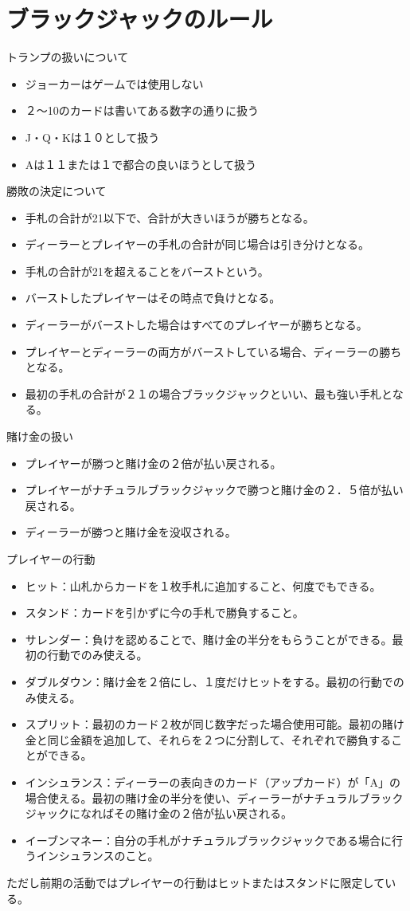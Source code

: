 \section{ブラックジャックのルール}

トランプの扱いについて
\begin{itemize}
\item ジョーカーはゲームでは使用しない
\item ２～10のカードは書いてある数字の通りに扱う
\item J・Q・Kは１０として扱う
\item Aは１１または１で都合の良いほうとして扱う
\end{itemize}
勝敗の決定について
\begin{itemize}
\item 手札の合計が21以下で、合計が大きいほうが勝ちとなる。
\item ディーラーとプレイヤーの手札の合計が同じ場合は引き分けとなる。
\item 手札の合計が21を超えることをバーストという。
\item バーストしたプレイヤーはその時点で負けとなる。
\item ディーラーがバーストした場合はすべてのプレイヤーが勝ちとなる。
\item プレイヤーとディーラーの両方がバーストしている場合、ディーラーの勝ちとなる。
\item 最初の手札の合計が２１の場合ブラックジャックといい、最も強い手札となる。
\end{itemize}
賭け金の扱い
\begin{itemize}
\item プレイヤーが勝つと賭け金の２倍が払い戻される。
\item プレイヤーがナチュラルブラックジャックで勝つと賭け金の２．５倍が払い戻される。
\item ディーラーが勝つと賭け金を没収される。
\end{itemize}
プレイヤーの行動
\begin{itemize}
\item ヒット：山札からカードを１枚手札に追加すること、何度でもできる。
\item スタンド：カードを引かずに今の手札で勝負すること。
\item サレンダー：負けを認めることで、賭け金の半分をもらうことができる。最初の行動でのみ使える。
\item ダブルダウン：賭け金を２倍にし、１度だけヒットをする。最初の行動でのみ使える。
\item スプリット：最初のカード２枚が同じ数字だった場合使用可能。最初の賭け金と同じ金額を追加して、それらを２つに分割して、それぞれで勝負することができる。
\item インシュランス：ディーラーの表向きのカード（アップカード）が「A」の場合使える。最初の賭け金の半分を使い、ディーラーがナチュラルブラックジャックになればその賭け金の２倍が払い戻される。
\item イーブンマネー：自分の手札がナチュラルブラックジャックである場合に行うインシュランスのこと。
\end{itemize}
ただし前期の活動ではプレイヤーの行動はヒットまたはスタンドに限定している。

